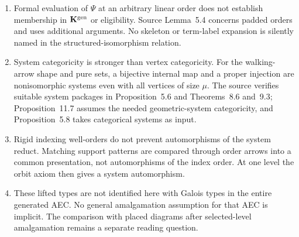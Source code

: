 \begin{remark}
\label{rem:working-template-arbitrary-orders}
\begin{enumerate}[label=\textup{(\roman*)},leftmargin=*]
\item Formal evaluation of $\Psi$ at an arbitrary linear order does not
establish membership in $\mathbf K^{\mathrm{gen}}$ or eligibility. Source
Lemma~5.4 concerns padded orders and uses additional arguments.
No skeleton or term-label expansion is silently named in the
structured-isomorphism relation.
\item System categoricity is stronger than vertex categoricity. For the
walking-arrow shape and pure sets, a bijective internal map and a proper
injection are nonisomorphic systems even with all vertices of size $\mu$.
The source verifies suitable system packages in Proposition~5.6 and
Theorems~8.6 and~9.3; Proposition~11.7 assumes the needed geometric-system
categoricity, and Proposition~5.8 takes categorical systems as input.
\item Rigid indexing well-orders do not prevent automorphisms of the
system reduct. Matching support patterns are compared through order
arrows into a common presentation, not automorphisms of the index order.
At one level the orbit axiom then gives a system automorphism.
\item These lifted types are not identified here with Galois types in
the entire generated AEC. No general amalgamation assumption for that
AEC is implicit. The comparison with placed diagrams after selected-level
amalgamation remains a separate reading question.
\end{enumerate}
\end{remark}
